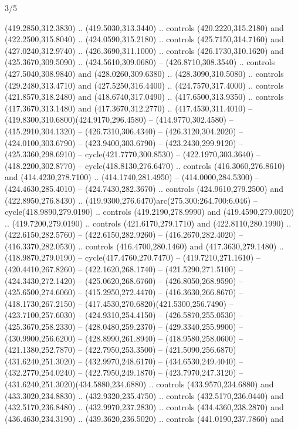 \begin{flagdescription}{3/5}
\begin{scope}[shift={(0.5\flaglength,0.5\flagwidth)},scale=\flagwidth/1075]
\begin{scope}[y=0.80pt, x=0.80pt, yscale=-2.37, xscale=2.37,xshift=-402,yshift=-230.4]
  (419.2850,312.3830) .. (419.5030,313.3440) .. controls (420.2220,315.2180) and
  (422.2500,315.8040) .. (424.0590,315.2180) .. controls (425.7150,314.7160) and
  (427.0240,312.9740) .. (426.3690,311.1000) .. controls (426.1730,310.1620) and
  (425.3670,309.5090) .. (424.5610,309.0680) -- (426.8710,308.3540) .. controls
  (427.5040,308.9840) and (428.0260,309.6380) .. (428.3090,310.5080) .. controls
  (429.2480,313.4710) and (427.5250,316.4400) .. (424.7570,317.4000) .. controls
  (421.8570,318.2480) and (418.6740,317.0490) .. (417.6500,313.9350) .. controls
  (417.3670,313.1480) and (417.3670,312.2770) .. (417.4530,311.4010) --
  (419.8300,310.6800)(424.9170,296.4580) -- (414.9770,302.4580) --
  (415.2910,304.1320) -- (426.7310,306.4340) -- (426.3120,304.2020) --
  (424.0100,303.6790) -- (423.9400,303.6790) -- (423.2430,299.9120) --
  (425.3360,298.6910) -- cycle(421.7770,300.8530) -- (422.1970,303.3640) --
  (418.2200,302.8770) -- cycle(418.8130,276.6470) .. controls
  (416.3060,276.8610) and (414.4230,278.7100) .. (414.1740,281.4950) --
  (414.0000,284.5300) -- (424.4630,285.4010) -- (424.7430,282.3670) .. controls
  (424.9610,279.2500) and (422.8950,276.8430) ..
  (419.9300,276.6470)arc(275.300:264.700:6.046) -- cycle(418.9890,279.0190) ..
  controls (419.2190,278.9990) and (419.4590,279.0020) .. (419.7200,279.0190) ..
  controls (421.6170,279.1710) and (422.8110,280.1990) .. (422.6150,282.5760) --
  (422.6150,282.9260) -- (416.2670,282.4020) -- (416.3370,282.0530) .. controls
  (416.4700,280.1460) and (417.3630,279.1480) .. (418.9870,279.0190) --
  cycle(417.4760,270.7470) -- (419.7210,271.1610) -- (420.4410,267.8260) --
  (422.1620,268.1740) -- (421.5290,271.5100) -- (424.3430,272.1420) --
  (425.0620,268.6760) -- (426.8050,268.9590) -- (425.6500,274.6060) --
  (415.2950,272.4470) -- (416.3630,266.8670) -- (418.1730,267.2150) --
  (417.4530,270.6820)(421.5300,256.7490) -- (423.7100,257.6030) --
  (424.9310,254.4150) -- (426.5870,255.0530) -- (425.3670,258.2330) --
  (428.0480,259.2370) -- (429.3340,255.9900) -- (430.9900,256.6200) --
  (428.8990,261.8940) -- (418.9580,258.0600) -- (421.1380,252.7870) --
  (422.7950,253.3500) -- (421.5090,256.6870)(431.6240,251.3020) --
  (432.9970,248.6170) -- (434.6530,249.4040) -- (432.2770,254.0240) --
  (422.7950,249.1870) -- (423.7970,247.3120) --
  (431.6240,251.3020)(434.5880,234.6880) .. controls (433.9570,234.6880) and
  (433.3020,234.8830) .. (432.9320,235.4750) .. controls (432.5170,236.0440) and
  (432.5170,236.8480) .. (432.9970,237.2830) .. controls (434.4360,238.2870) and
  (436.4630,234.3190) .. (439.3620,236.5020) .. controls (441.0190,237.7860) and

\end{scope}
\end{scope}
\end{flagdescription}

